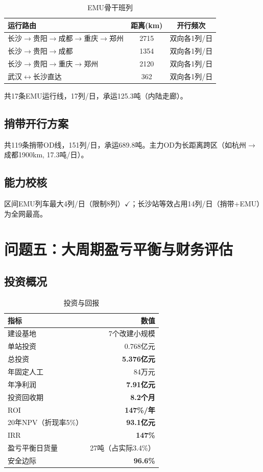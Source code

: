 \documentclass[12pt,a4paper,fontset=none]{ctexart}
\begin{document}
\begin{table}[H]\centering\small
\caption{EMU骨干班列}\label{tab:emu}
\begin{tabular}{lcc}
\toprule
运行路由 & 距离(km) & 开行频次 \\
\midrule
长沙$\to$贵阳$\to$成都$\to$重庆$\to$郑州 & 2715 & 双向各1列/日 \\
长沙$\to$贵阳$\to$成都 & 1354 & 双向各1列/日 \\
长沙$\to$贵阳$\to$重庆$\to$郑州 & 2120 & 双向各1列/日 \\
武汉$\leftrightarrow$长沙直达 & 362 & 双向各1列/日 \\
\bottomrule
\end{tabular}
\end{table}

共17条EMU运行线，17列/日，承运125.3吨（内陆走廊）。

\subsection{捎带开行方案}

共119条捎带OD线，151列/日，承运689.8吨。主力OD为长距离跨区（如杭州$\to$成都1900km, 17.3吨/日）。

\subsection{能力校核}
区间EMU列车最大4列/日（限制8列）$\checkmark$；长沙站等效占用14列/日（捎带+EMU）为全网最高。

\section{问题五：大周期盈亏平衡与财务评估}

\subsection{投资概况}

\begin{table}[H]\centering\small
\caption{投资与回报}\label{tab:invest}
\begin{tabular}{lr}
\toprule
指标 & 数值 \\
\midrule
建设基地 & 7个改建小规模 \\
单站投资 & 0.768亿元 \\
总投资 & \textbf{5.376亿元} \\
年固定人工 & 84万元 \\
\midrule
年净利润 & \textbf{7.91亿元} \\
投资回收期 & \textbf{8.2个月} \\
ROI & \textbf{147\%/年} \\
20年NPV（折现率5\%） & \textbf{93.1亿元} \\
IRR & \textbf{147\%} \\
盈亏平衡日货量 & 27吨（占实际3.4\%） \\
安全边际 & \textbf{96.6\%} \\
\bottomrule
\end{tabular}
\end{table}
\end{document}

